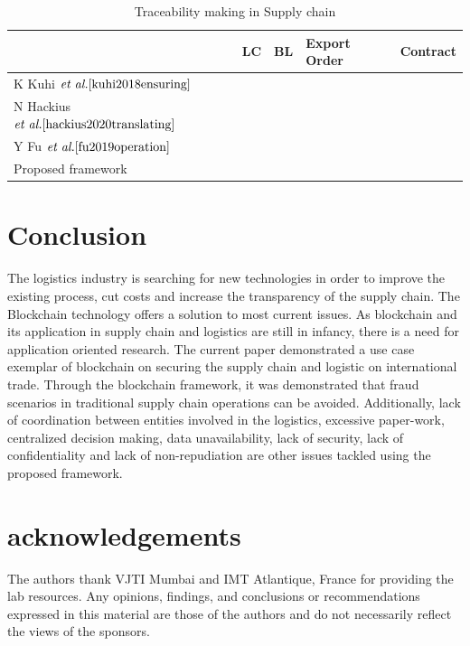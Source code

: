 \documentclass[num-refs]{wiley-article}
\newcommand{\cmark}{\ding{51}}%
\newcommand{\xmark}{\ding{55}}%
\begin{document}
\begin{table}[!h]
\centering
\caption{Traceability making in Supply chain}
\begin{tabular}{|l|l|l|l|l|}
\hline
                                                          & \textbf{LC} & \textbf{BL} & \textbf{Export Order} & \textbf{Contract} \\ \hline
K Kuhi $\textit{et al.} \cite{kuhi2018ensuring}$          &   \cmark        &     \cmark        &               \xmark        &       \cmark            \\ \hline
N Hackius $\textit{et al.} \cite{hackius2020translating}$ &       \cmark      &         \xmark    &        \xmark                &            \cmark       \\ \hline
Y Fu $\textit{et al.} \cite{fu2019operation}$             &        \xmark     &      \xmark        &            \cmark           &         \cmark          \\ \hline
Proposed framework                                        &     \cmark        &     \cmark        &           \cmark            &    \cmark               \\ \hline
\end{tabular}
\label{trace}
\end{table}


\section{Conclusion} \label{conc}
The logistics industry is searching for new technologies in order to improve the existing process, cut costs and increase the transparency of the supply chain. The Blockchain technology offers a solution to most current issues. As blockchain and its application in supply chain and logistics are still in infancy, there is a need for application oriented research. The current paper demonstrated a use case exemplar of blockchain on securing the supply chain and logistic on international trade. Through the blockchain framework, it was demonstrated that fraud scenarios in traditional supply chain operations can be avoided. Additionally, lack of coordination between entities involved in the logistics, excessive paper-work, centralized decision making, data unavailability, lack of security, lack of confidentiality and lack of non-repudiation are other issues tackled using the proposed framework.

\section*{acknowledgements}
The authors thank VJTI Mumbai and IMT Atlantique, France for providing the lab resources. Any opinions, findings, and conclusions or recommendations expressed in this material are those of the authors and do not necessarily reflect the views of the sponsors.
\end{document}
